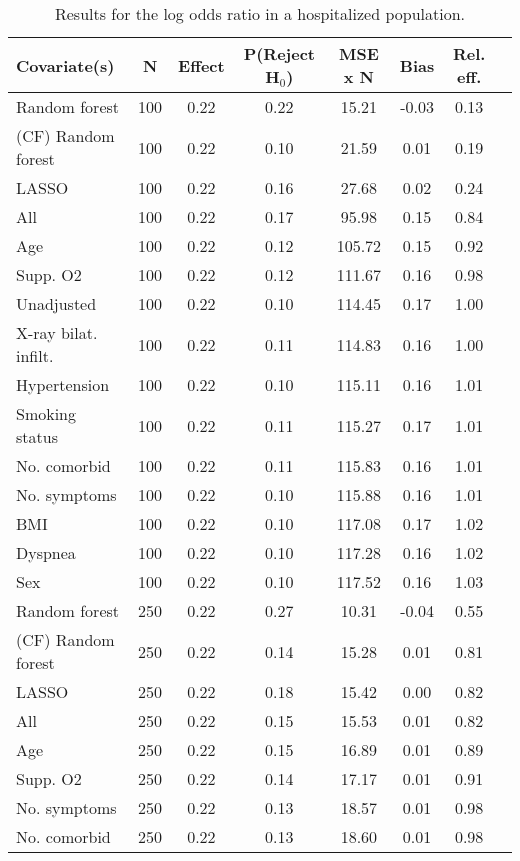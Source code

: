 \documentclass{article}
\begin{document}
{\tabcolsep=6pt  %
\begin{longtable}{lccccccc}
\caption{Results for the log odds ratio in a hospitalized population.} \\
Covariate(s) & N & Effect & P(Reject H$_0$) & MSE x N & Bias & Rel. eff.\\ \midrule
Random forest & 100 & 0.22 & 0.22 &  15.21 & -0.03 & 0.13 \\ 
(CF) Random forest & 100 & 0.22 & 0.10 &  21.59 &  0.01 & 0.19 \\ 
LASSO & 100 & 0.22 & 0.16 &  27.68 &  0.02 & 0.24 \\ 
All & 100 & 0.22 & 0.17 &  95.98 &  0.15 & 0.84 \\ 
Age & 100 & 0.22 & 0.12 & 105.72 &  0.15 & 0.92 \\ 
Supp. O2 & 100 & 0.22 & 0.12 & 111.67 &  0.16 & 0.98 \\ 
Unadjusted & 100 & 0.22 & 0.10 & 114.45 &  0.17 & 1.00 \\ 
X-ray bilat. infilt. & 100 & 0.22 & 0.11 & 114.83 &  0.16 & 1.00 \\ 
Hypertension & 100 & 0.22 & 0.10 & 115.11 &  0.16 & 1.01 \\ 
Smoking status & 100 & 0.22 & 0.11 & 115.27 &  0.17 & 1.01 \\ 
No. comorbid & 100 & 0.22 & 0.11 & 115.83 &  0.16 & 1.01 \\ 
No. symptoms & 100 & 0.22 & 0.10 & 115.88 &  0.16 & 1.01 \\ 
BMI & 100 & 0.22 & 0.10 & 117.08 &  0.17 & 1.02 \\ 
Dyspnea & 100 & 0.22 & 0.10 & 117.28 &  0.16 & 1.02 \\ 
Sex & 100 & 0.22 & 0.10 & 117.52 &  0.16 & 1.03 \\ \midrule() 
Random forest & 250 & 0.22 & 0.27 &  10.31 & -0.04 & 0.55 \\ 
(CF) Random forest & 250 & 0.22 & 0.14 &  15.28 &  0.01 & 0.81 \\ 
LASSO & 250 & 0.22 & 0.18 &  15.42 &  0.00 & 0.82 \\ 
All & 250 & 0.22 & 0.15 &  15.53 &  0.01 & 0.82 \\ 
Age & 250 & 0.22 & 0.15 &  16.89 &  0.01 & 0.89 \\ 
Supp. O2 & 250 & 0.22 & 0.14 &  17.17 &  0.01 & 0.91 \\ 
No. symptoms & 250 & 0.22 & 0.13 &  18.57 &  0.01 & 0.98 \\ 
No. comorbid & 250 & 0.22 & 0.13 &  18.60 &  0.01 & 0.98 \\ 

\end{longtable}}
\end{document}
